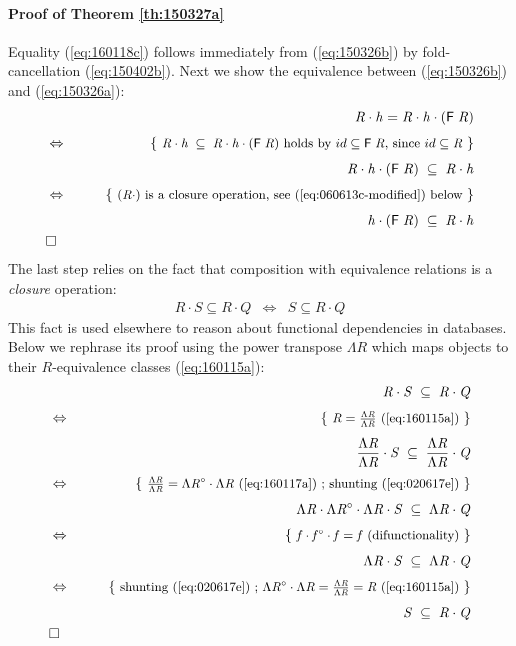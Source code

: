 \documentclass{elsarticle}
\newcommand{\Conid}[1]{\mathit{#1}}
\newcommand{\Varid}[1]{\mathit{#1}}
\def\comp{ \mathbin{\cdot} }
\def\conv#1{#1^\circ}
\def\fun#1{\mathsf{#1}}
\def\just#1#2{\\ &#1& \rule{2em}{0pt} \{ \mbox{\rule[-.7em]{0pt}{1.8em} \small #2 \/} \} \nonumber\\ && }
\def\qed{\\&\Box&\nonumber}
\def\start{&&}
\def\equiv{\Leftrightarrow}
\begin{document}
\paragraph{Proof of Theorem \ref{th:150327a}}
Equality (\ref{eq:160118c}) follows immediately from (\ref{eq:150326b})
by fold-cancellation (\ref{eq:150402b}). Next we show the equivalence
between (\ref{eq:150326b}) and (\ref{eq:150326a}):
\begin{eqnarray*}
\start
	\ensuremath{\Conid{R} \comp \Varid{h}\mathrel{=}\Conid{R} \comp \Varid{h} \comp (\fun F \;\Conid{R})}
%
\just\equiv{\ensuremath{\Conid{R} \comp \Varid{h}\; \subseteq \;\Conid{R} \comp \Varid{h} \comp (\fun F \;\Conid{R})} holds by \ensuremath{{{id}}\subseteq{\fun F \;\Conid{R}}}, since \ensuremath{{{id}}\subseteq{\Conid{R}}}}
%
	\ensuremath{\Conid{R} \comp \Varid{h} \comp (\fun F \;\Conid{R})\; \subseteq \;\Conid{R} \comp \Varid{h}}
%
\just\equiv{ \ensuremath{(\Conid{R} \comp )} is a {closure} operation, see (\ref{eq:060613c-modified})  below}
%
	\ensuremath{\Varid{h} \comp (\fun F \;\Conid{R})\; \subseteq \;\Conid{R} \comp \Varid{h}}
\qed
\end{eqnarray*}
The last step relies on the fact that composition with equivalence relations is a \emph{closure}
operation:
\begin{eqnarray}
	 R \comp S \subseteq R \comp Q & \equiv & S \subseteq R \comp Q
	\label{eq:060613c-modified}
\end{eqnarray}
This fact is used elsewhere \cite{Ol11} to reason about functional dependencies in databases.
Below we rephrase its proof using the power transpose \ensuremath{\Lambda{\Conid{R}}} which maps
objects to their \ensuremath{\Conid{R}}-equivalence classes (\ref{eq:160115a}):
\begin{eqnarray*}
\start
	\ensuremath{\Conid{R} \comp \Conid{S}\; \subseteq \;\Conid{R} \comp \Conid{Q}}
%
\just\equiv{ \ensuremath{\Conid{R}\mathrel{=}\frac{\Lambda{\Conid{R}}}{\Lambda{\Conid{R}}}} (\ref{eq:160115a}) }
%
	\ensuremath{\frac{\Lambda{\Conid{R}}}{\Lambda{\Conid{R}}} \comp \Conid{S}\; \subseteq \;\frac{\Lambda{\Conid{R}}}{\Lambda{\Conid{R}}} \comp \Conid{Q}}
%
\just\equiv{ \ensuremath{\frac{\Lambda{\Conid{R}}}{\Lambda{\Conid{R}}}\mathrel{=}\conv{\Lambda{\Conid{R}}} \comp \Lambda{\Conid{R}}} (\ref{eq:160117a}) ; shunting (\ref{eq:020617e}) }
%
	\ensuremath{\Lambda{\Conid{R}} \comp \conv{\Lambda{\Conid{R}}} \comp \Lambda{\Conid{R}} \comp \Conid{S}\; \subseteq \;\Lambda{\Conid{R}} \comp \Conid{Q}}
%
\just\equiv{\ensuremath{\Varid{f} \comp \conv{\Varid{f}} \comp \Varid{f}\mathrel{=}\Varid{f}} (difunctionality)}
%
	\ensuremath{\Lambda{\Conid{R}} \comp \Conid{S}\; \subseteq \;\Lambda{\Conid{R}} \comp \Conid{Q}}
%
\just\equiv{ shunting (\ref{eq:020617e}) ; \ensuremath{\conv{\Lambda{\Conid{R}}} \comp \Lambda{\Conid{R}}\mathrel{=}\frac{\Lambda{\Conid{R}}}{\Lambda{\Conid{R}}}\mathrel{=}\Conid{R}} (\ref{eq:160115a})}
%
	\ensuremath{\Conid{S}\; \subseteq \;\Conid{R} \comp \Conid{Q}}
\qed
\end{eqnarray*}
\end{document}
